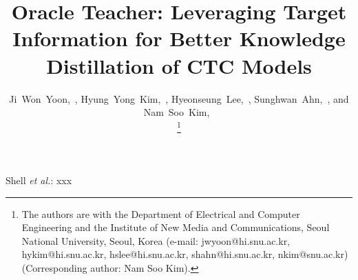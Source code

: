 \documentclass[journal]{IEEEtran}
\begin{document}
\title{Oracle Teacher: Leveraging Target Information for Better Knowledge Distillation of CTC Models}
\author{Ji~Won~Yoon,~, 
Hyung~Yong~Kim,~,
Hyeonseung~Lee,~,
Sunghwan~Ahn,~, and Nam~Soo~Kim,~

\thanks{The authors are with the Department of Electrical and Computer Engineering and the Institute of New Media and Communications, Seoul National University, Seoul, Korea (e-mail: jwyoon@hi.snu.ac.kr, hykim@hi.snu.ac.kr, hslee@hi.snu.ac.kr, shahn@hi.snu.ac.kr, nkim@snu.ac.kr) (Corresponding author: Nam Soo Kim).}
}


\ifCLASSOPTIONpeerreview
\author{
} \fi

%
{Shell \MakeLowercase{\textit{et al.}}: xxx}

\maketitle
\end{document}
